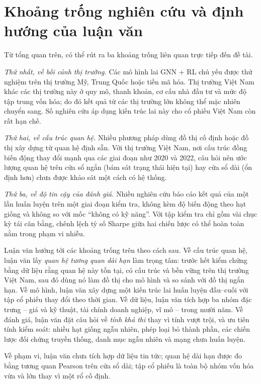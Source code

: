 \section{Khoảng trống nghiên cứu và định hướng của luận văn}

Từ tổng quan trên, có thể rút ra ba khoảng trống liên quan trực tiếp đến đề tài.

\textit{Thứ nhất, về bối cảnh thị trường.} Các mô hình lai GNN + RL chủ yếu được thử nghiệm trên thị trường Mỹ, Trung Quốc hoặc tiền mã hóa. Thị trường Việt Nam khác các thị trường này ở quy mô, thanh khoản, cơ cấu nhà đầu tư và mức độ tập trung vốn hóa; do đó kết quả từ các thị trường lớn không thể mặc nhiên chuyển sang. Số nghiên cứu áp dụng kiến trúc lai này cho cổ phiếu Việt Nam còn rất hạn chế.

\textit{Thứ hai, về cấu trúc quan hệ.} Nhiều phương pháp dùng đồ thị cố định hoặc đồ thị xây dựng từ quan hệ định sẵn. Với thị trường Việt Nam, nơi cấu trúc đồng biến động thay đổi mạnh qua các giai đoạn như 2020 và 2022, câu hỏi nên ước lượng quan hệ trên cửa sổ ngắn (bám sát trạng thái hiện tại) hay cửa sổ dài (ổn định hơn) chưa được khảo sát một cách có hệ thống.

\textit{Thứ ba, về độ tin cậy của đánh giá.} Nhiều nghiên cứu báo cáo kết quả của một lần huấn luyện trên một giai đoạn kiểm tra, không kèm độ biến động theo hạt giống và không so với mốc ``không có kỹ năng''. Với tập kiểm tra chỉ gồm vài chục kỳ tái cân bằng, chênh lệch tỷ số Sharpe giữa hai chiến lược có thể hoàn toàn nằm trong phạm vi nhiễu.

Luận văn hướng tới các khoảng trống trên theo cách sau. Về cấu trúc quan hệ, luận văn lấy \emph{quan hệ tương quan dài hạn} làm trọng tâm: trước hết kiểm chứng bằng dữ liệu rằng quan hệ này tồn tại, có cấu trúc và bền vững trên thị trường Việt Nam, sau đó dùng nó làm đồ thị cho mô hình và so sánh với đồ thị ngắn hạn. Về mô hình, luận văn xây dựng một kiến trúc lai huấn luyện đầu--cuối với tập cổ phiếu thay đổi theo thời gian. Về dữ liệu, luận văn tích hợp ba nhóm đặc trưng -- giá và kỹ thuật, tài chính doanh nghiệp, vĩ mô -- trong mười năm. Về đánh giá, luận văn đặt câu hỏi về \emph{tính khả thi} thay vì tính vượt trội, và ưu tiên tính kiểm soát: nhiều hạt giống ngẫu nhiên, phép loại bỏ thành phần, các chiến lược đối chứng truyền thống, danh mục ngẫu nhiên và mạng chưa huấn luyện.

Về phạm vi, luận văn chưa tích hợp dữ liệu tin tức; quan hệ dài hạn được đo bằng tương quan Pearson trên cửa sổ dài; tập cổ phiếu là toàn bộ nhóm vốn hóa vừa và lớn thay vì một rổ cố định.

